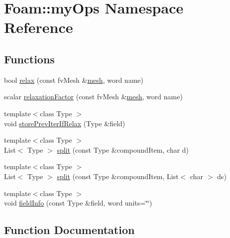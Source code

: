 \hypertarget{namespaceFoam_1_1myOps}{}\section{Foam\+:\+:my\+Ops Namespace Reference}
\label{namespaceFoam_1_1myOps}
\subsection*{Functions}
\begin{DoxyCompactItemize}
\item 
bool \hyperlink{namespaceFoam_1_1myOps_ae64b7628dd8a488daf43b4530d219792}{relax} (const fv\+Mesh \&\hyperlink{createMeshesPostProcess_8H_a8bb1e58291d2d2b653e024a4f4bffe38}{mesh}, word name)
\item 
scalar \hyperlink{namespaceFoam_1_1myOps_afeb41c0b205c62740edc6190b2143111}{relaxation\+Factor} (const fv\+Mesh \&\hyperlink{createMeshesPostProcess_8H_a8bb1e58291d2d2b653e024a4f4bffe38}{mesh}, word name)
\item 
{\footnotesize template$<$class Type $>$ }\\void \hyperlink{namespaceFoam_1_1myOps_abeee007f59aa62edc180f978d5d730dc}{store\+Prev\+Iter\+If\+Relax} (Type \&field)
\item 
{\footnotesize template$<$class Type $>$ }\\List$<$ Type $>$ \hyperlink{namespaceFoam_1_1myOps_a9c6941fd6343a31e270e81867634452e}{split} (const Type \&compound\+Item, char d)
\item 
{\footnotesize template$<$class Type $>$ }\\List$<$ Type $>$ \hyperlink{namespaceFoam_1_1myOps_acee49ca9cdd20d6fb1250c0eff9bd2d0}{split} (const Type \&compound\+Item, List$<$ char $>$ ds)
\item 
{\footnotesize template$<$class Type $>$ }\\void \hyperlink{namespaceFoam_1_1myOps_a7c1be504bf64208dff04f082c8efda62}{field\+Info} (const Type \&field, word units=\char`\"{}\char`\"{})
\end{DoxyCompactItemize}


\subsection{Function Documentation}
\mbox{\label{namespaceFoam_1_1myOps_ae64b7628dd8a488daf43b4530d219792}} 
